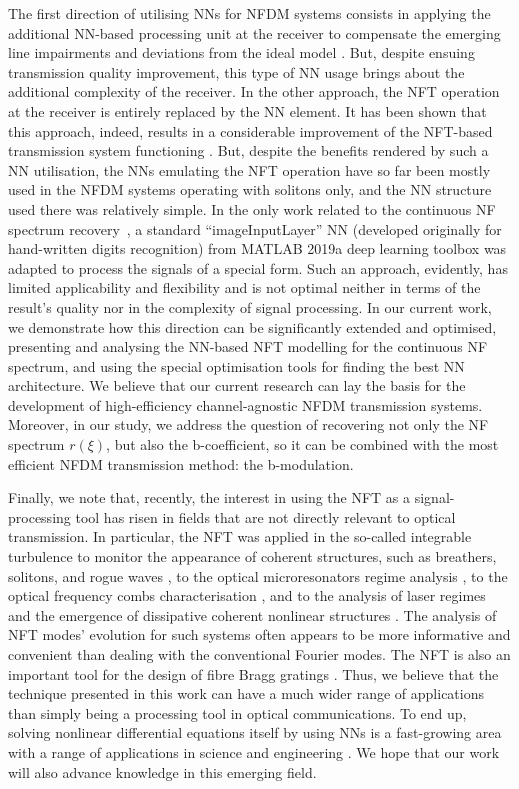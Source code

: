 The first direction of utilising NNs for NFDM systems consists in applying the additional NN-based processing unit at the receiver to compensate the emerging line impairments and deviations from the ideal model \cite{gdd18,kwp19,kkp19,kpk20,kkp21}. But, despite ensuing transmission quality improvement, this type of NN usage brings about the additional complexity of the receiver. In the other approach, the NFT operation at the receiver is entirely replaced by the NN element. It has been shown that this approach, indeed, results in a considerable improvement of the NFT-based transmission system functioning \cite{ymm19,jgy18,wxz20}. But, despite the benefits rendered by such a NN utilisation, the NNs emulating the NFT operation have so far been mostly used in the NFDM systems operating with solitons only, and the NN structure used there was relatively simple.  In the only work related to the continuous NF spectrum recovery~\cite{zhang2021direct}, a standard ``imageInputLayer'' NN (developed originally for hand-written digits recognition) from MATLAB 2019a deep learning toolbox was adapted to process the signals of a special form. Such an approach, evidently, has limited applicability and flexibility and is not optimal neither in terms of the result's quality nor in the complexity of signal processing. 
In our current work, we demonstrate how this direction can be significantly extended and optimised, presenting and analysing the NN-based NFT modelling for the continuous NF spectrum, and using the special optimisation tools for finding the best NN architecture. We believe that our current research can lay the basis for the development of high-efficiency channel-agnostic NFDM transmission systems. Moreover, in our study, we address the question of recovering not only the NF spectrum $r(\xi)$, but also the b-coefficient, so it can be combined with the most efficient NFDM transmission method: the b-modulation.

Finally, we note that, recently, the interest in using the NFT as a signal-processing tool has risen in fields that are not directly relevant to optical transmission. In particular, the NFT was applied in the so-called integrable turbulence to monitor the appearance of coherent structures, such as breathers, solitons, and rogue waves \cite{rsc18,sda16}, to the optical microresonators regime analysis \cite{tcf20}, to the optical frequency combs characterisation \cite{wsh20}, and to the analysis of laser regimes and the emergence of dissipative coherent nonlinear structures \cite{rnb18,skp19,csf19}. The analysis of NFT modes' evolution for such systems often appears to be more informative and convenient than dealing with the conventional Fourier modes. The NFT is also an important tool for the design of fibre Bragg gratings \cite{FBG01,FBG02}. Thus, we believe that the technique presented in this work can have a much wider range of applications than simply being a processing tool in optical communications. To end up, solving nonlinear differential equations itself by using NNs is a fast-growing area with a range of applications in science and engineering \cite{rbp17,lkb18,lka20}. We hope that our work will also advance knowledge in this emerging field.
